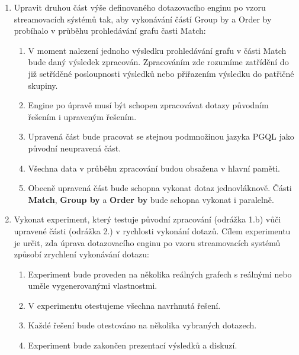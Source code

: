 \begin{enumerate}
\item
Upravit druhou část výše definovaného dotazovacího enginu po vzoru streamovacích sýstémů tak, aby vykonávání částí Group by a Order by probíhalo v průběhu prohledávání grafu časti Match:
\begin{enumerate}

\item
V moment nalezení jednoho výsledku prohledávání grafu v části Match bude daný výsledek zpracován.
Zpracováním zde rozumíme zatřídění do již setříděné posloupnosti výsledků nebo přiřazením výsledku do patřičné skupiny.

\item 
Engine po úpravě musí být schopen zpracovávat dotazy původním řešením i upraveným řešením.

\item
Upravená část bude pracovat se stejnou podmnožinou jazyka PGQL jako původní neupravená část.

\item
Všechna data v průběhu zpracování budou obsažena v hlavní paměti.

\item
Obecně upravená část bude schopna vykonat dotaz jednovláknově.
Části \textbf{Match}, \textbf{Group by} a \textbf{Order by} bude schopna vykonat i paralelně.
\end{enumerate}

\item
Vykonat experiment, který testuje původní zpracování (odrážka 1.b) vůči upravené části (odrážka 2.) v rychlosti vykonání dotazů.
Cílem experimentu je určit, zda úprava dotazovacího enginu po vzoru streamovacích systémů způsobí zrychlení vykonávání dotazu:
\begin{enumerate}
\item Experiment bude proveden na několika reálných grafech s reálnými nebo uměle vygenerovanými vlastnostmi.
\item V experimentu otestujeme všechna navrhnutá řešení.
\item Každé řešení bude otestováno na několika vybraných dotazech.
\item Experiment bude zakončen prezentací výsledků a diskuzí.
\end{enumerate}
\end{enumerate}